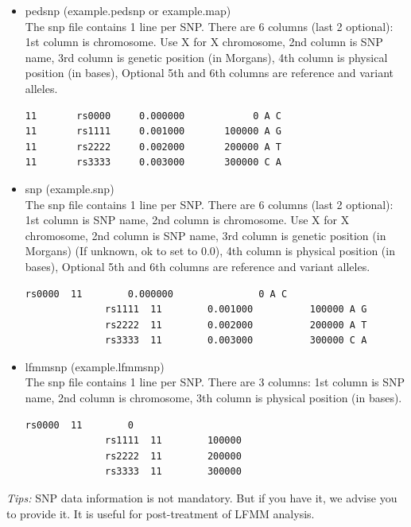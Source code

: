 \documentclass[10pt,a4paper]{article}
\begin{document}
\begin{itemize}
\item pedsnp (example.pedsnp or example.map) \\
The snp file contains 1 line per SNP.  There are 6 columns (last 2 optional):
  1st column is chromosome.  Use X for X chromosome,
  2nd column is SNP name,
  3rd column is genetic position (in Morgans),
  4th column is physical position (in bases),
  Optional 5th and 6th columns are reference and variant alleles.

\begin{center}
\footnotesize
\begin{Verbatim}[frame=single]
11       rs0000     0.000000            0 A C
11       rs1111     0.001000       100000 A G
11       rs2222     0.002000       200000 A T
11       rs3333     0.003000       300000 C A
\end{Verbatim}
\end{center}

\item snp (example.snp) \\
The snp file contains 1 line per SNP.  There are 6 columns (last 2 optional):
  1st column is SNP name,
  2nd column is chromosome.  Use X for X chromosome,
  2nd column is SNP name,
  3rd column is genetic position (in Morgans)  (If unknown, ok to set to 0.0),
  4th column is physical position (in bases),
  Optional 5th and 6th columns are reference and variant alleles.
\begin{center}
\footnotesize
\begin{Verbatim}[frame=single]
              rs0000  11        0.000000               0 A C
              rs1111  11        0.001000          100000 A G
              rs2222  11        0.002000          200000 A T
              rs3333  11        0.003000          300000 C A
\end{Verbatim}
\end{center}

\item lfmmsnp (example.lfmmsnp) \\
The snp file contains 1 line per SNP.  There are 3 columns:
  1st column is SNP name,
  2nd column is chromosome,
  3th column is physical position (in bases).
\begin{center}
\footnotesize
\begin{Verbatim}[frame=single]
              rs0000  11        0
              rs1111  11        100000
              rs2222  11        200000
              rs3333  11        300000
\end{Verbatim}
\end{center}
\end{itemize}
\noindent
{\it Tips:} SNP data information is not mandatory. But if you have it, we advise you to provide it.
It is useful for post-treatment of LFMM analysis.
\end{document}
